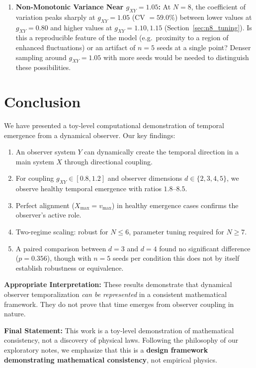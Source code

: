 \documentclass[12pt,a4paper]{article}
\begin{document}
\begin{enumerate}[leftmargin=*]
\item \textbf{Non-Monotonic Variance Near $g_{XY}=1.05$:}
At $N=8$, the coefficient of variation peaks sharply at $g_{XY}=1.05$
(CV $=59.0\%$) between lower values at $g_{XY}=0.80$ and higher values at
$g_{XY}=1.10,1.15$ (Section~\ref{sec:n8_tuning}). Is this a reproducible
feature of the model (e.g.\ proximity to a region of enhanced
fluctuations) or an artifact of $n=5$ seeds at a single point? Denser
sampling around $g_{XY}=1.05$ with more seeds would be needed to
distinguish these possibilities.
\end{enumerate}

\section{Conclusion}\label{sec:conclusion}

We have presented a toy-level computational demonstration of temporal 
emergence from a dynamical observer. Our key findings:

\begin{enumerate}[leftmargin=*]
\item An observer system $Y$ can dynamically create the temporal direction 
      in a main system $X$ through directional coupling.
\item For coupling $g_{XY} \in [0.8, 1.2]$ and observer dimensions 
      $d \in \{2, 3, 4, 5\}$, we observe healthy temporal emergence with 
      ratios $1.8$--$8.5$.
\item Perfect alignment ($X_{\max} = v_{\max}$) in healthy emergence cases 
      confirms the observer's active role.
\item Two-regime scaling: robust for $N \leq 6$, parameter tuning required 
      for $N \geq 7$.
\item A paired comparison between $d=3$ and $d=4$ found no significant
      difference ($p = 0.356$), though with $n=5$ seeds per condition
      this does not by itself establish robustness or equivalence.
\end{enumerate}

\textbf{Appropriate Interpretation:} These results demonstrate that 
dynamical observer temporalization \textit{can be represented} in a 
consistent mathematical framework. They do not prove that time emerges 
from observer coupling in nature.

\textbf{Final Statement:} This work is a toy-level demonstration of 
mathematical consistency, not a discovery of physical laws. Following 
the philosophy of our exploratory notes, we emphasize that this is a 
\textbf{design framework demonstrating mathematical consistency}, 
not empirical physics.



\end{document}
